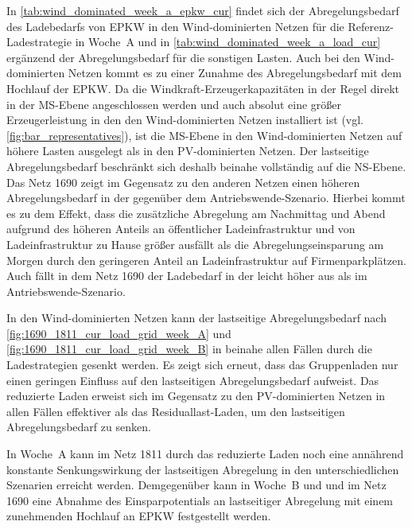 



In \autoref{tab:wind_dominated_week_a_epkw_cur} findet sich der Abregelungsbedarf des Ladebedarfs von \gls{EPKW} in den Wind-dominierten Netzen für die Referenz-Ladestrategie in Woche~A und in \autoref{tab:wind_dominated_week_a_load_cur} ergänzend der Abregelungsbedarf für die sonstigen Lasten.
Auch bei den Wind-dominierten Netzen kommt es zu einer Zunahme des Abregelungsbedarf mit dem Hochlauf der \gls{EPKW}.
Da die Windkraft-Erzeugerkapazitäten in der Regel direkt in der \gls{MS}-Ebene angeschlossen werden und auch absolut eine größer Erzeugerleistung in den den Wind-dominierten Netzen installiert ist (vgl. \autoref{fig:bar_representatives}), ist die \gls{MS}-Ebene in den Wind-dominierten Netzen auf höhere Lasten ausgelegt als in den \gls{PV}-dominierten Netzen.
Der lastseitige Abregelungsbedarf beschränkt sich deshalb beinahe vollständig auf die \gls{NS}-Ebene.
Das Netz \num{1690} zeigt im Gegensatz zu den anderen Netzen einen höheren Abregelungsbedarf in der \SzeFirmenparkplatz gegenüber dem Antriebswende-Szenario.
Hierbei kommt es zu dem Effekt, dass die zusätzliche Abregelung am Nachmittag und Abend aufgrund des höheren Anteils an öffentlicher Ladeinfrastruktur und von Ladeinfrastruktur zu Hause größer ausfällt als die Abregelungseinsparung am Morgen durch den geringeren Anteil an Ladeinfrastruktur auf Firmenparkplätzen.
Auch fällt in dem Netz \num{1690} der Ladebedarf in der \SzeFirmenparkplatz leicht höher aus als im Antriebswende-Szenario.





In den Wind-dominierten Netzen kann der lastseitige Abregelungsbedarf nach \autoref{fig:1690_1811_cur_load_grid_week_A} und \autoref{fig:1690_1811_cur_load_grid_week_B} in beinahe allen Fällen durch die Ladestrategien gesenkt werden.
Es zeigt sich erneut, dass das Gruppenladen nur einen geringen Einfluss auf den lastseitigen Abregelungsbedarf aufweist.
Das reduzierte Laden erweist sich im Gegensatz zu den \gls{PV}-dominierten Netzen in allen Fällen effektiver als das Residuallast-Laden, um den lastseitigen Abregelungsbedarf zu senken.\medskip

In Woche~A kann im Netz \num{1811} durch das reduzierte Laden noch eine annährend konstante Senkungswirkung der lastseitigen Abregelung in den unterschiedlichen Szenarien erreicht werden.
Demgegenüber kann in Woche~B und und im Netz \num{1690} eine Abnahme des Einsparpotentials an lastseitiger Abregelung mit einem zunehmenden Hochlauf an \gls{EPKW} festgestellt werden.


